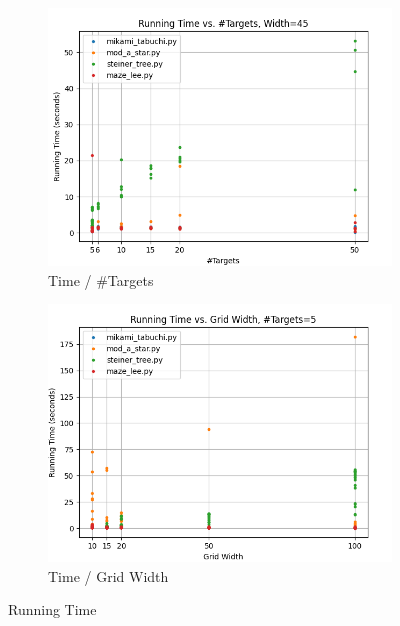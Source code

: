\begin{figure}
\centering

\begin{subfigure}[b]{\linewidth}
    \includegraphics[width=\linewidth]{figures/plots/areaConst.png}
    \caption{Time / \#Targets}
\end{subfigure}
\begin{subfigure}[b]{\linewidth}
    \includegraphics[width=\linewidth]{figures/plots/nConst.png}
    \caption{Time / Grid Width}
\end{subfigure}

\caption{Running Time}
\label{fig:runningTime}
\end{figure}